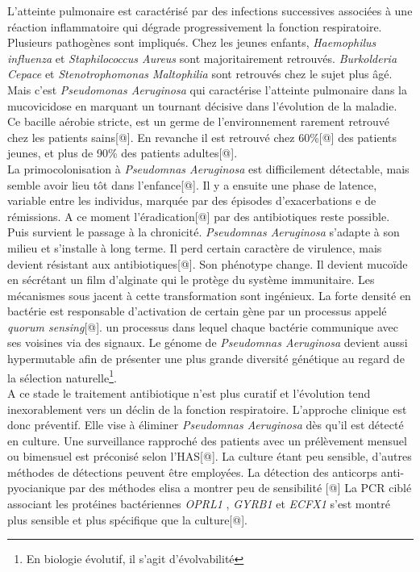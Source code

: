 \documentclass[12pt,a4paper]{article}
\begin{document}
L’atteinte pulmonaire est caractérisé par des infections successives associées à une réaction inflammatoire qui dégrade progressivement la fonction respiratoire.
Plusieurs pathogènes sont impliqués. Chez les jeunes enfants, \textit{Haemophilus influenza} et \textit{Staphilococcus Aureus} sont majoritairement retrouvés. \textit{Burkolderia Cepace} et \textit{Stenotrophomonas Maltophilia} sont retrouvés chez le sujet plus âgé.
Mais c’est \textit{Pseudomonas Aeruginosa} qui caractérise l’atteinte pulmonaire dans la mucovicidose en marquant un tournant décisive dans l’évolution de la maladie. Ce bacille aérobie stricte, est un germe de l'environnement rarement retrouvé chez les patients sains[@]. En revanche il est retrouvé chez 60\%[@] des patients jeunes, et plus de 90\% des patients adultes[@].\\
La primocolonisation à \textit{Pseudomnas Aeruginosa} est difficilement détectable, mais semble avoir lieu tôt dans l’enfance[@]. Il y a ensuite une phase de latence, variable entre les individus, marquée par des épisodes d’exacerbations e de rémissions. A ce moment l’éradication[@] par des antibiotiques reste possible.
Puis survient le passage à la chronicité. \textit{Pseudomnas Aeruginosa} s'adapte à son milieu et s’installe à long terme. Il perd certain caractère de virulence, mais devient résistant aux antibiotiques[@]. Son phénotype change. Il devient mucoïde en sécrétant un film d’alginate qui le protège du système immunitaire. Les mécanismes sous jacent à cette transformation sont ingénieux. La forte densité en bactérie est responsable d’activation de certain gène par un processus appelé \textit{quorum sensing}[@]. un processus dans lequel chaque bactérie communique avec ses voisines via des signaux.
Le génome de \textit{Pseudomnas Aeruginosa} devient aussi hypermutable afin de présenter une plus grande diversité génétique au regard de la sélection naturelle\footnote{En biologie évolutif, il s'agit d'évolvabilité}. \\
A ce stade le traitement antibiotique n’est plus curatif et l'évolution tend inexorablement vers un déclin de la fonction respiratoire.
L'approche clinique est donc préventif. Elle vise à éliminer \textit{Pseudomnas Aeruginosa} dès qu'il est détecté en culture. Une surveillance rapproché des patients avec un prélèvement mensuel ou bimensuel est préconisé selon l'HAS[@]. La culture étant peu sensible, d’autres méthodes de détections peuvent être employées. La détection des anticorps anti-pyocianique par des méthodes elisa a montrer peu de sensibilité [@]
La PCR ciblé associant les protéines bactériennes \textit{OPRL1} , \textit{GYRB1} et \textit{ECFX1}  s’est montré plus sensible et plus spécifique que la culture[@]. \\
\end{document}
